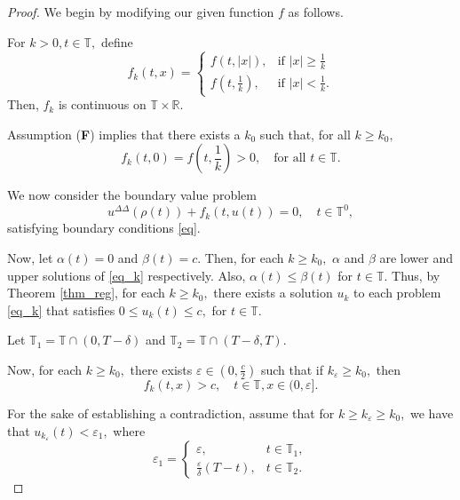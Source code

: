 \documentclass[10pt,a4paper]{amsart}
\begin{document}
\begin{proof}
	We begin by modifying our given function $f$ as follows.
	
	For $k > 0, t \in \mathbb{T},$ define
	\begin{equation*}
	f_{k}(t,x) = \left\{\begin{array}{ll}
	f\left(t,|x|\right), & \text{if } |x| \geq \frac{1}{k} \\
	f\left(t,\frac{1}{k}\right), & \text{if } |x| < \frac{1}{k}.
	\end{array}\right.
	\end{equation*}
	Then, $f_{k}$ is continuous on $\mathbb{T} \times \mathbb{R}.$
	
	Assumption (\textbf{F}) implies that there exists a $k_{0}$ such that, for all $k \geq k_{0},$ $$f_{k}(t,0) = f\left(t,\frac{1}{k}\right) > 0, \quad \text{for all } t \in \mathbb{T}.$$
	
	We now consider the boundary value problem
	\begin{equation}\label{eq_k}
	u^{\Delta\Delta}(\rho(t)) + f_{k}(t, u(t)) = 0, \quad t \in \mathbb{T}^0,
	\end{equation}
	satisfying boundary conditions \eqref{eq}.
	
	Now, let $\alpha(t) = 0$ and $\beta(t) = c.$  Then, for each $k \geq k_{0},$ $\alpha$ and $\beta$ are lower and upper solutions of \eqref{eq_k} respectively.  Also, $\alpha(t) \leq \beta(t)$ for $t \in \mathbb{T}.$  Thus, by Theorem \ref{thm_reg}, for each $k \geq k_{0},$ there exists a solution $u_k$ to each problem \eqref{eq_k} that satisfies $0 \leq u_{k}(t) \leq c,$ for $t \in \mathbb{T}.$
	
	Let $\mathbb{T}_1 = \mathbb{T} \cap (0, T-\delta)$ and $\mathbb{T}_2 = \mathbb{T} \cap (T-\delta, T).$
	
	Now, for each $k \geq k_0,$ there exists $\varepsilon \in \left(0, \frac{c}{2}\right)$ such that if $k_{\varepsilon} \geq k_{0},$ then 
	\begin{equation}\label{fk}
		f_{k}(t, x) > c, \quad t \in \mathbb{T}, x \in (0, \varepsilon].
	\end{equation}
	
	For the sake of establishing a contradiction, assume that for $k \geq k_{\varepsilon} \geq k_0,$ we have that $u_{k_{\varepsilon}}(t) < \varepsilon_1,$ where 
	\begin{equation*}
		\varepsilon_1 = \left\{
		\begin{array}{ll}
			\varepsilon, & t \in \mathbb{T}_1, \\
			\frac{\varepsilon}{\delta}(T-t), & t \in \mathbb{T}_2.
		\end{array}
		\right.
	\end{equation*}
	

\end{proof}
\end{document}

